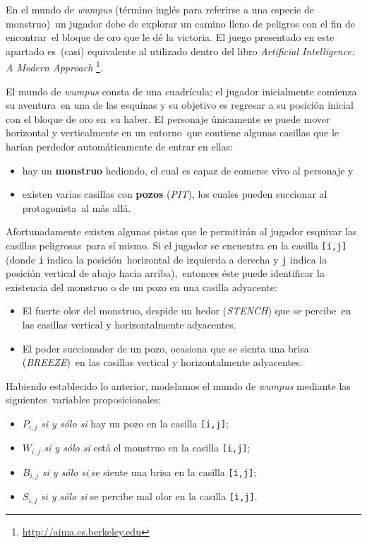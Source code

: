 \documentclass[paper=letter, fontsize=12pt]{scrartcl}
\begin{document}
\noindent
En el mundo de \emph{wumpus} (término inglés para referirse a una especie de monstruo)\
un jugador debe de explorar un camino lleno de peligros con el fin de encontrar\
el bloque de oro que le dé la victoria. El juego presentado en este apartado es\
(casi) equivalente al utilizado dentro del libro \emph{Artificial Intelligence: A Modern Approach}%
\footnote{\url{http://aima.cs.berkeley.edu}}.\par
El mundo de \emph{wumpus} consta de una cuadrícula; el jugador inicialmente comienza su aventura\
en una de las esquinas y su objetivo es regresar a su posición inicial con el bloque de oro en\
su haber. El personaje únicamente se puede mover horizontal y verticalmente en un entorno\
que contiene algunas casillas que le harían perdedor automáticamente de entrar en ellas:
\begin{itemize}
\item hay un \textbf{monstruo} hediondo, el cual es capaz de comerse vivo al personaje y
\item existen varias casillas con \textbf{pozos} (\emph{PIT}), los cuales pueden succionar al protagonista\
  al más allá.
\end{itemize}\par
Afortunadamente existen algunas pistas que le permitirán al jugador esquivar las casillas peligrosas\
para sí mismo. Si el jugador se encuentra en la casilla \verb+[i,j]+ (donde \verb+i+ indica la posición\
horizontal de izquierda a derecha y \verb+j+ indica la posición vertical de abajo hacia arriba),\
entonces éste puede identificar la existencia del monstruo o de un pozo en una casilla adyacente:
\begin{itemize}
\item El fuerte olor del monstruo, despide un hedor (\emph{STENCH}) que se percibe\
  en las casillas vertical y horizontalmente adyacentes.
\item El poder succionador de un pozo, ocasiona que se sienta una brisa (\emph{BREEZE})\
  en las casillas vertical y horizontalmente adyacentes.
\end{itemize}\par
Habiendo establecido lo anterior, modelamos el mundo de \emph{wumpus} mediante las siguientes\
variables proposicionales:
\begin{itemize}
\item $P_{i,j}$ \emph{si y sólo si} hay un pozo en la casilla \verb+[i,j]+;
\item $W_{i,j}$ \emph{si y sólo si} está el monstruo en la casilla \verb+[i,j]+;
\item $B_{i,j}$ \emph{si y sólo si} se siente una brisa en la casilla \verb+[i,j]+;
\item $S_{i,j}$ \emph{si y sólo si} se percibe mal olor en la casilla \verb+[i,j]+.
\end{itemize}\par
\end{document}

